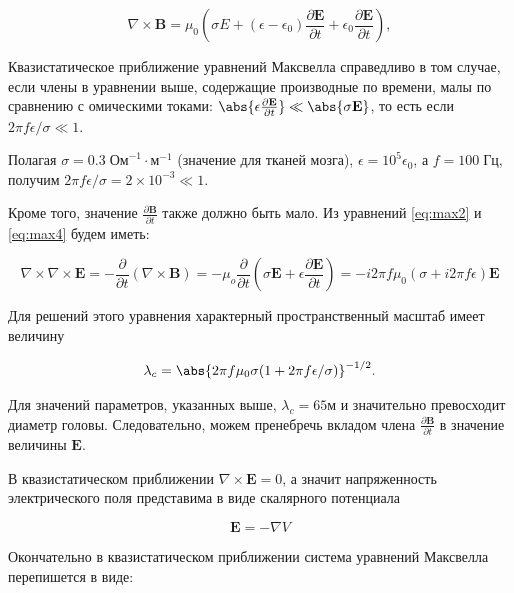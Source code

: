 \begin{equation}
    \nabla \times \mathbf{B} = \mu_0 (\sigma E +
    (\epsilon - \epsilon_0) \frac{\partial \mathbf{E}}{\partial t} +
    \epsilon_0 \frac{\partial \mathbf{E}}{\partial t}),
\end{equation}

Квазистатическое приближение уравнений Максвелла справедливо в том случае, если
члены в уравнении выше, содержащие производные по времени, малы по сравнению с
омическими токами: $\abs{\epsilon \frac{\partial \mathbf{E}}{\partial t}} \ll
\abs{\sigma \mathbf{E}}$, то есть если $2\pi f \epsilon / \sigma \ll 1$.

Полагая $\sigma = 0.3\;\text{Ом}^{-1} \cdot \text{м}^{-1}$  (значение для
тканей мозга), $\epsilon = 10^5\epsilon_0$, а $f =  100\;\text{Гц}$, получим
$2\pi f \epsilon / \sigma = 2 \times 10^{-3} \ll 1$.

Кроме того, значение $\frac{\partial \mathbf{B}}{\partial t}$ также должно быть
мало.  Из уравнений \ref{eq:max2} и \ref{eq:max4} будем иметь:

\begin{equation}
    \nabla \times \nabla \times \mathbf{E} =
    - \frac{\partial}{\partial t} (\nabla \times \mathbf{B}) =
    - \mu_o \frac{\partial}{\partial t}(\sigma \mathbf{E} + \epsilon \frac{\partial \mathbf{E}}{\partial t}) =
    - i 2\pi f \mu_0 (\sigma + i 2\pi f \epsilon) \mathbf{E}
\end{equation}

Для решений этого уравнения характерный пространственный масштаб имеет величину

\begin{equation}
    \lambda_c = \abs{2\pi f \mu_0 \sigma (1 + 2\pi f \epsilon / \sigma)}^{-1/2}.
\end{equation}

Для значений параметров, указанных выше, $\lambda_c  = 65 \text{м}$ и
значительно превосходит диаметр головы. Следовательно, можем пренебречь вкладом
члена $\frac{\partial \mathbf{B}}{\partial t}$ в значение величины
$\mathbf{E}$.

В квазистатическом приближении $\nabla \times \mathbf{E} = 0$, а значит
напряженность электрического поля представима в виде скалярного потенциала

\begin{equation}
    \mathbf{E} = - \nabla V
    \label{eq:scal_pot}
\end{equation}

Окончательно в квазистатическом приближении система уравнений Максвелла перепишется в виде:

